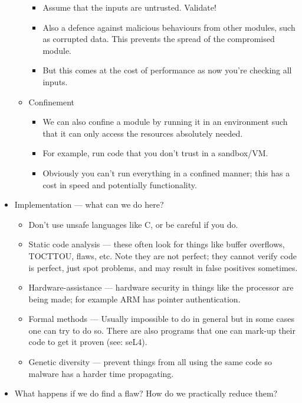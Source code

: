 \documentclass{article}
\begin{document}
\begin{itemize}
\begin{itemize}
\begin{itemize}
                    \item Assume that the inputs are untrusted.  Validate!
                    \item Also a defence against malicious behaviours from other modules, such as corrupted data.  This prevents the spread of the compromised module.
                    \item But this comes at the cost of performance as now you're checking all inputs.
                \end{itemize}
            \item Confinement
                \begin{itemize}
                    \item We can also confine a module by running it in an environment such that it can only access the resources absolutely needed.
                    \item For example, run code that you don't trust in a sandbox/VM.
                    \item Obviously you can't run everything in a confined manner; this has a cost in speed and potentially functionality.
                \end{itemize}
        \end{itemize}
    \item Implementation --- what can we do here?
        \begin{itemize}
            \item Don't use unsafe languages like C, or be careful if you do.
            \item Static code analysis --- these often look for things like buffer overflows, TOCTTOU, flaws, etc.  Note they are not perfect; they cannot verify code is perfect, just spot problems, and may result in false positives sometimes.
            \item Hardware-assistance --- hardware security in things like the processor are being made; for example ARM has pointer authentication.
            \item Formal methods --- Usually impossible to do in general but in some cases one can try to do so.  There are also programs that one can mark-up their code to get it proven (see: seL4).
            \item Genetic diversity --- prevent things from all using the same code so malware has a harder time propagating.  
        \end{itemize}
    \item What happens if we do find a flaw?  How do we practically reduce them?

\end{itemize}
\end{document}
